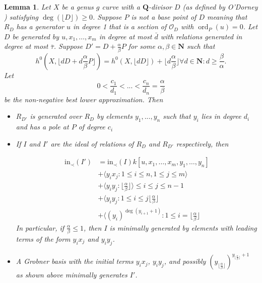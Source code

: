 \documentclass{amsart}
\theoremstyle{plain}
\newtheorem{lem}[thm]{Lemma}
\theoremstyle{definition}
\theoremstyle{remark}
\numberwithin{equation}{section}
\newcommand\so{{\mathscr O}}
\DeclareMathOperator{\ord}{ord}
\newcommand \initial{\text{in}}
\newcommand \gin{\text{gin}}
\begin{document}
\begin{lem}
\label{lem:deg1_sat_ind}
Let $X$ be a genus $g$ curve with a $\mathbf{Q}$-divisor $D$ (as
defined by O'Dorney )
satisfying $\deg(\lfloor{D}\rfloor)\ge 0$.  Suppose $P$ is not a base point of $D$ meaning that $R_D$ has a
generator $u$ in degree 1 that is a section of $\so_D$ with $\ord_P(u)=0$.  Let $D$ be generated by $u, x_1, \ldots, x_m$ in degree at most $\bar{d}$ with relations generated 
in degree at most $\bar{\tau}$.  Suppose $D' = D + \frac{\alpha}{\beta} P$
for some $\alpha,\beta \in \mathbf{N}$ such
that
\begin{equation}
\label{eqn:deg1_sat_ind_dim}
	h^0(X, \lfloor{dD + d\frac{\alpha}{\beta} P \rfloor}) = h^0(X,\lfloor dD
	\rfloor) + \lfloor d\frac{\alpha} {\beta} \rfloor \forall d \in \mathbf{
	N} : d \ge \frac{\beta}{\alpha}.
\end{equation}
Let 
\[
	0<\frac{c_1}{d_1}<...<\frac{c_n}{d_n}=\frac{\alpha}{\beta}
\]
be the non-negative best lower approximation.
Then 
\begin{itemize}
\item $R_{D'}$ is generated over $R_D$ by elements $y_1,...,y_n$ such that $y_i$ lies in  
degree $d_i$ and has a pole at $P$ of degree $c_i$

\item If $I$ and $I'$ are the ideal of relations of $R_D$ and $R_{D'}$ respectively, then 

\begin{align*}
	\initial_\prec(I') &= \initial_\prec(I) k[u, x_1, \ldots, x_m, y_1, \ldots, y_n] \\
										 &+ \langle y_i x_j: 1 \le i \le n, 1 \le j \le m \rangle \\
										 &+ \langle y_i y_j: \lfloor \frac{\alpha}{\beta} \rfloor \rangle \le i \le j \le n-1 \\
										 &+ \langle y_i y_j: 1\le i\le j\lfloor \frac{\alpha}{\beta} \rfloor\\
										 &+ \langle (y_i)^{\deg(y_{i+1}+1)}: 1\le i=\lfloor \frac{\alpha}{\beta} \rfloor
\end{align*}
In particular, if $\frac{\alpha}{\beta}\le 1$, then $I$ is minimally generated by elements with leading terms of the form $y_ix_j$ and $y_iy_j$.
\item A Grobner basis with the initial terms $y_i x_j$, $y_iy_j$, and possibly $(y_{\lfloor \frac{\alpha}{\beta} \rfloor})^{y_{\lfloor \frac{\alpha}{\beta} \rfloor}+1}$ as shown above minimally generates $I'$.
\end{itemize}
\end{lem}
\end{document}
